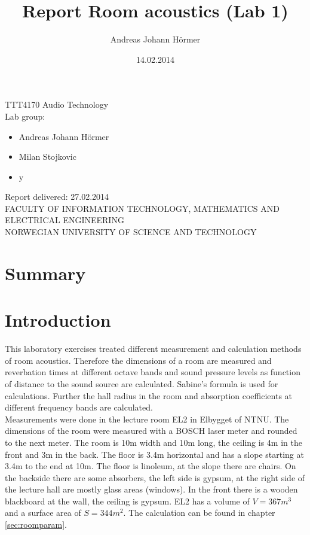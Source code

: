 \documentclass{article}
\title{Report Room acoustics (Lab 1)}
\author{Andreas Johann H\"ormer}
\date{14.02.2014}
\begin{document}
\maketitle
\begin{center}
TTT4170 Audio Technology\\[3cm]
Lab group:
\begin{itemize}
\item Andreas Johann H\"ormer
\item Milan Stojkovic
\item y\\[3cm]
\end{itemize}
Report delivered: 27.02.2014\\[6cm]
FACULTY OF INFORMATION TECHNOLOGY, MATHEMATICS AND ELECTRICAL ENGINEERING\\
NORWEGIAN UNIVERSITY OF SCIENCE AND TECHNOLOGY
\end{center}

\tableofcontents

\newpage
\section*{Summary}

\newpage
\section{Introduction}
This laboratory exercises treated different measurement and calculation methods of room acoustics. Therefore the dimensions of a room are measured and reverbation times at different octave bands and sound pressure levels as function of distance to the sound source are calculated. Sabine's formula is used for calculations. Further the hall radius in the room and absorption coefficients at different frequency bands are calculated.\\
Measurements were done in the lecture room EL2 in Elbygget of NTNU. The dimensions of the room were measured with a BOSCH laser meter and rounded to the next meter. The room is 10m width and 10m long, the ceiling is 4m in the front and 3m in the back. The floor is 3.4m horizontal and has a slope starting at 3.4m to the end at 10m. The floor is linoleum, at the slope there are chairs. On the backside there are some absorbers, the left side is gypsum, at the right side of the lecture hall are mostly glass areas (windows). In the front there is a wooden blackboard at the wall, the ceiling is gypsum. EL2 has a volume of $V=367m^3$ and a surface area of $S=344m^2$. The calculation can be found in chapter \ref{sec:roomparam}.
\end{document}
